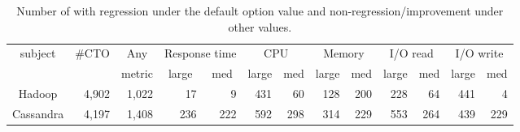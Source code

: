 \begin{table}[t]
\centering
    \caption{Number of \instance with regression under the default option value and  non-regression/improvement under other values.}
     \begin{tabular}{|c|c|c|c|r|c|r|c|r|c|r|c|r|}
    \hline
    \multirow{2}{*}{subject} & \multirow{2}{*}{\#CTO}     & Any                        & \multicolumn{2}{c|}{Response time}                  & \multicolumn{2}{c|}{CPU}                            & \multicolumn{2}{c|}{Memory}                         & \multicolumn{2}{c|}{I/O read}                       & \multicolumn{2}{c|}{I/O write}                      \\ \cline{4-13} 
                             &                            & metric                     & large                    & \multicolumn{1}{c|}{med} & large                    & \multicolumn{1}{c|}{med} & large                    & \multicolumn{1}{c|}{med} & large                    & \multicolumn{1}{c|}{med} & large                    & \multicolumn{1}{c|}{med} \\ \hline
    Hadoop                   & \multicolumn{1}{r|}{4,902} & \multicolumn{1}{r|}{1,022} & \multicolumn{1}{r|}{17}  & 9                        & \multicolumn{1}{r|}{431} & 60                       & \multicolumn{1}{r|}{128} & 200                      & \multicolumn{1}{r|}{228} & 64                       & \multicolumn{1}{r|}{441} & 4                        \\ \hline
    Cassandra                & \multicolumn{1}{r|}{4,197} & \multicolumn{1}{r|}{1,408} & \multicolumn{1}{r|}{236} & 222                      & \multicolumn{1}{r|}{592} & 298                      & \multicolumn{1}{r|}{314} & 229                      & \multicolumn{1}{r|}{553} & 264                      & \multicolumn{1}{r|}{439} & 229                      \\ \hline
    \end{tabular}
\label{tab:option_regression_default}
\end{table}




